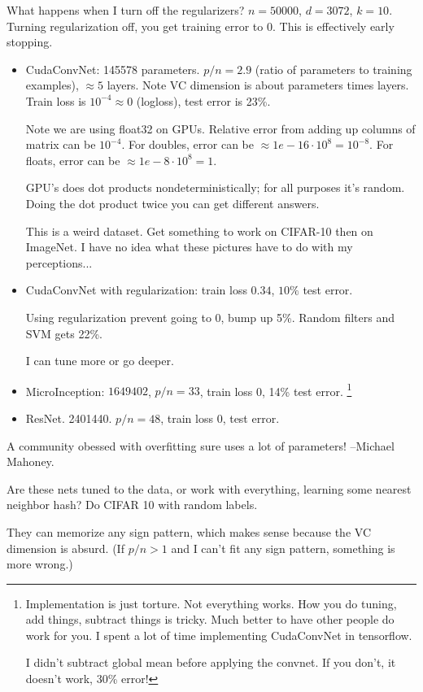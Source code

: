 What happens when I turn off the regularizers? $n=50000$, $d=3072$, $k=10$. Turning regularization off, you get training error to 0. This is effectively early stopping. 
\begin{itemize}
\item
CudaConvNet: 145578 parameters. $p/n=2.9$ (ratio of parameters to training examples), $\approx 5$ layers. Note VC dimension is about parameters times layers. Train loss is $10^{-4}\approx 0$ (logloss), test error is 23\%.

Note we are using float32 on GPUs.
Relative error from adding up columns of matrix can be $10^{-4}$.
For doubles, error can be $\approx 1e-16\cdot 10^8 = 10^{-8}$. For floats, error can be $\approx 1e-8\cdot 10^8 = 1$.

GPU's does dot products nondeterministically; for all purposes it's random. Doing the dot product twice you can get different answers. 

This is a weird dataset. Get something to work on CIFAR-10 then on ImageNet. I have no idea what these pictures have to do with my perceptions...
\item
CudaConvNet with regularization: train loss $0.34$, $10\%$ test error.

Using regularization prevent going to 0, bump up 5\%. %
Random filters and SVM gets 22\%.

I can tune more or go deeper.
\item
MicroInception: $1649402$, $p/n=33$, train loss 0, 14\% test error.
\footnote{
Implementation is just torture. Not everything works. How you do tuning, add things, subtract things is tricky. Much better to have other people do work for you. I spent a lot of time implementing CudaConvNet in tensorflow.

I didn't subtract global mean before applying the convnet. If you don't, it doesn't work, 30\% error!}
\item
ResNet. 2401440. $p/n=48$, train loss 0, test error.
\end{itemize}

A community obessed with overfitting sure uses a lot of parameters! --Michael Mahoney.

Are these nets tuned to the data, or work with everything, learning some nearest neighbor hash? Do CIFAR 10 with random labels.

They can memorize any sign pattern, which makes sense because the VC dimension is absurd. (If $p/n>1$ and I can't fit any sign pattern, something is more wrong.)

